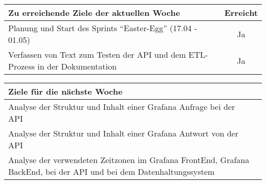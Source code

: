 \begin{tabularx}{\textwidth}{Xc}
    \arrayrulecolor{OliveGreen}
    \toprule
    {\bfseries Zu erreichende Ziele der aktuellen Woche} & {\bfseries Erreicht} \\
    \midrule[2pt]
    Planung und Start des Sprints ``Easter-Egg'' (17.04 - 01.05)  &  Ja  \\
    \rowcolor{OliveGreen!15}
    Verfassen von Text zum Testen der API und dem ETL-Prozess in der
    Dokumentation  &  Ja  \\
    \bottomrule[2pt]
\end{tabularx}
%
\vspace{1cm}
%
\begin{tabularx}{\textwidth}{Xc}
    \arrayrulecolor{OliveGreen}
    \toprule
    {\bfseries Ziele für die nächste Woche}              &                   \\
    \midrule[2pt]
    Analyse der Struktur und Inhalt einer Grafana Anfrage bei der API  &  \\
    \rowcolor{OliveGreen!15}
    Analyse der Struktur und Inhalt einer Grafana Antwort von der API  &  \\
    \rowcolor{White}
    Analyse der verwendeten Zeitzonen im Grafana FrontEnd, Grafana BackEnd, bei
    der API und bei dem Datenhaltungssystem  &  \\
\end{tabularx}
